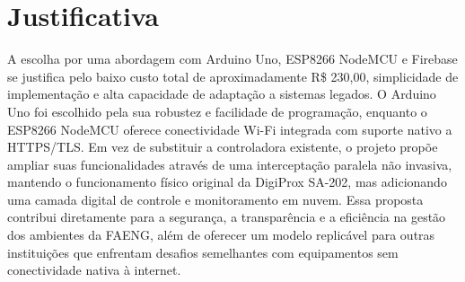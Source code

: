 \section{Justificativa}
\label{Sec:Justificativa}
A escolha por uma abordagem com Arduino Uno, ESP8266 NodeMCU e Firebase se justifica pelo baixo custo total de aproximadamente R\$ 230,00, simplicidade de implementação e alta capacidade de adaptação a sistemas legados. O Arduino Uno foi escolhido pela sua robustez e facilidade de programação, enquanto o ESP8266 NodeMCU oferece conectividade Wi-Fi integrada com suporte nativo a HTTPS/TLS. Em vez de substituir a controladora existente, o projeto propõe ampliar suas funcionalidades através de uma interceptação paralela não invasiva, mantendo o funcionamento físico original da DigiProx SA-202, mas adicionando uma camada digital de controle e monitoramento em nuvem.
Essa proposta contribui diretamente para a segurança, a transparência e a eficiência na gestão dos ambientes da FAENG, além de oferecer um modelo replicável para outras instituições que enfrentam desafios semelhantes com equipamentos sem conectividade nativa à internet.

